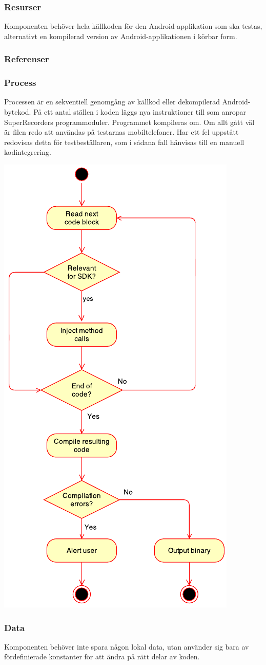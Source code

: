 \subsubsection{Resurser}
Komponenten behöver hela källkoden för den Android-applikation som ska testas, alternativt en kompilerad version av Android-applikationen i körbar form.

\subsubsection{Referenser}

\subsubsection{Process}
Processen är en sekventiell genomgång av källkod eller dekompilerad Android-bytekod. På ett antal ställen i koden läggs nya instruktioner till som anropar SuperRecorders programmoduler. Programmet kompileras om. Om allt gått väl är filen redo att användas på testarnas mobiltelefoner. Har ett fel uppstått redovisas detta för testbeställaren, som i sådana fall hänvisas till en manuell kodintegrering.

\includegraphics[scale=1.0]{integrateState.pdf}

\subsubsection{Data}
Komponenten behöver inte spara någon lokal data, utan använder sig bara av fördefinierade konstanter för att ändra på rätt delar av koden.
